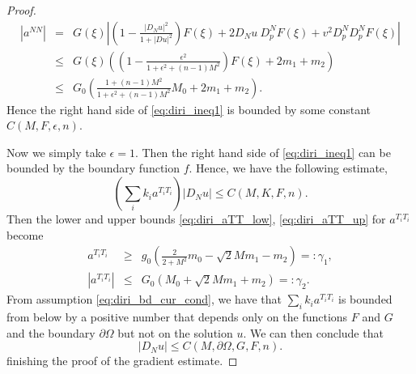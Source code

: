 \documentclass[12pt]{article}
\numberwithin{equation}{section}
\theoremstyle{plain}
\theoremstyle{definition}
\theoremstyle{remark}
\begin{document}
\begin{proof}
\begin{eqnarray*}
    |a^{NN}| &= & G(\xi) \left| \left( 1 - \frac{|D_N u|^2}{1+|Du|^2} \right) F(\xi) +  2 D_N u \ D^{N}_p F(\xi) + v^2 D^{N}_p D^{N}_p F(\xi) \right| \\
    & \leq & G(\xi) \left( \left( 1 - \frac{\epsilon^2}{1 + \epsilon^2 + (n-1)M^2} \right) F(\xi) + 2 m_1 + m_2  \right) \\
    & \leq &G_0 \left( \frac{1 + (n-1)M^2}{1 + \epsilon^2 + (n-1)M^2}  M_0 + 2 m_1 + m_2  \right).
\end{eqnarray*}
Hence the right hand side of \eqref{eq:diri_ineq1} is bounded by some constant $C(M,F,\epsilon,n)$. 

Now we simply take $\epsilon=1$. Then the right hand side of \eqref{eq:diri_ineq1} can be bounded by the boundary function $f$. Hence, we have the following estimate,
\begin{equation}    
\left(\sum_i k_i a^{T_i T_i}\right) |D_N u| \leq C(M,K,F,n).
\end{equation}
Then the lower and upper bounds \eqref{eq:diri_aTT_low}, \eqref{eq:diri_aTT_up}
for $a^{T_iT_i}$ become
\begin{eqnarray}
    a^{T_i T_i} &\geq& g_0 \left( \frac{2}{2+M^2} m_0 -\sqrt{2} M m_1 - m_2 \right) =: \gamma_1,\\
    |a^{T_i T_i}| &\leq& G_0 \left( M_0 +\sqrt{2} M m_1 +m_2 \right) =: \gamma_2.
\end{eqnarray}
From assumption \eqref{eq:diri_bd_cur_cond}, we have that 
$\sum_i k_i a^{T_i T_i}$ is bounded from below by a positive number that depends only
on the functions $F$ and $G$ and the boundary $\partial\Omega$ but not on the solution
$u$.
We can then conclude that 
\begin{equation*}
    |D_N u| \leq C(M, \partial\Omega, G, F, n).
\end{equation*}
finishing the proof of the gradient estimate.
\end{proof}
\end{document}
